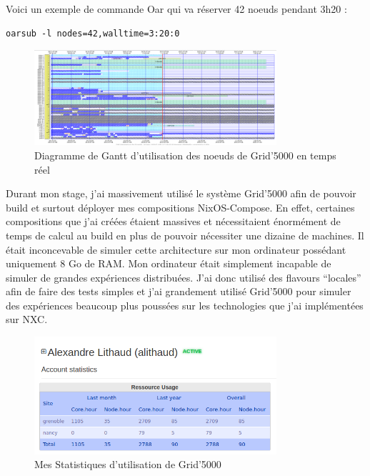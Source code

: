 \documentclass[a4paper,french,12pt, titlepage]{article}
\begin{document}
Voici un exemple de commande Oar qui va réserver 42 noeuds pendant 3h20
:

\begin{verbatim}
oarsub -l nodes=42,walltime=3:20:0
\end{verbatim}

\begin{figure}[h]
\centering
\includegraphics[width=0.8\textwidth,height=0.8\textheight,keepaspectratio]{images/ganttg5k.png}
\caption{Diagramme de Gantt d'utilisation des noeuds de Grid'5000 en temps réel}
\end{figure}

Durant mon stage, j'ai massivement utilisé le système Grid'5000 afin de
pouvoir build et surtout déployer mes compositions NixOS-Compose. En
effet, certaines compositions que j'ai créées étaient massives et
nécessitaient énormément de temps de calcul au build en plus de pouvoir
nécessiter une dizaine de machines. Il était inconcevable de simuler
cette architecture sur mon ordinateur possédant uniquement 8 Go de RAM.
Mon ordinateur était simplement incapable de simuler de grandes
expériences distribuées. J'ai donc utilisé des flavours ``locales'' afin
de faire des tests simples et j'ai grandement utilisé Grid'5000 pour
simuler des expériences beaucoup plus poussées sur les technologies que
j'ai implémentées sur NXC.\newline

\begin{figure}[h]
\centering
\includegraphics[width=0.8\textwidth,height=0.8\textheight,keepaspectratio]{images/statg5k.png}
\caption{Mes Statistiques d'utilisation de Grid'5000}
\end{figure}
\end{document}
